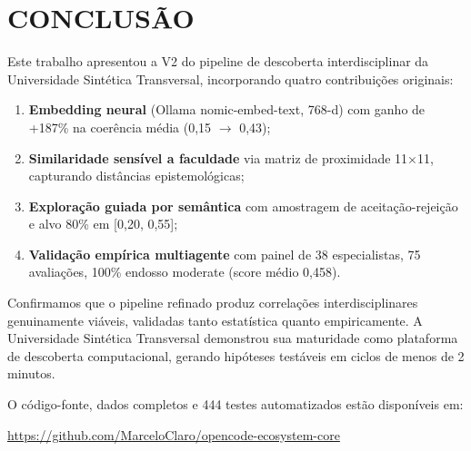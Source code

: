 \documentclass[a4paper,12pt]{article}
\begin{document}
\section{CONCLUSÃO}\label{sec:conclusao}

Este trabalho apresentou a V2 do pipeline de descoberta interdisciplinar da 
Universidade Sintética Transversal, incorporando quatro contribuições originais:

\begin{enumerate}
    \item \textbf{Embedding neural} (Ollama nomic-embed-text, 768-d) com ganho 
          de +187\% na coerência média (0,15 $\to$ 0,43);
    \item \textbf{Similaridade sensível a faculdade} via matriz de proximidade 
          11×11, capturando distâncias epistemológicas;
    \item \textbf{Exploração guiada por semântica} com amostragem de 
          aceitação-rejeição e alvo 80\% em [0,20, 0,55];
    \item \textbf{Validação empírica multiagente} com painel de 38 especialistas, 
          75 avaliações, 100\% endosso moderate (score médio 0,458).
\end{enumerate}

Confirmamos que o pipeline refinado produz correlações interdisciplinares 
genuinamente viáveis, validadas tanto estatística quanto empiricamente. 
A Universidade Sintética Transversal demonstrou sua maturidade como plataforma 
de descoberta computacional, gerando hipóteses testáveis em ciclos de menos 
de 2 minutos.

O código-fonte, dados completos e 444 testes automatizados estão disponíveis em:

\begin{center}
\url{https://github.com/MarceloClaro/opencode-ecosystem-core}
\end{center}
\end{document}
